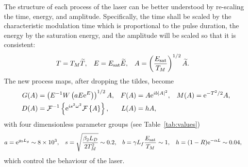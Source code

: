 %
%
%

The structure of each process of the laser can be better understood by re-scaling the time, energy, and amplitude. Specifically, the time shall be scaled by the characteristic modulation time which is proportional to the pulse duration, the energy by the saturation energy, and the amplitude will be scaled so that it is consistent:
\begin{align*}
	T &= T_M \widetilde{T},& E &= E_{\textrm{sat}} \widetilde{E},& A &= \left( \frac{E_{\textrm{sat}}}{T_M} \right)^{1/2} \widetilde{A}.
\end{align*}
The new process maps, after dropping the tildes, become
\begin{align*}
	G(A) &= \left(E^{-1} W \left( a E \textrm{e}^{E}\right) \right)^{1/2} A,&
	F(A) &= A \textrm{e}^{i b |A|^2},&
	M(A) &= \textrm{e}^{-T^2 / 2} A, \\
	D(A) &= \mathcal{F}^{-1}\left\{ \textrm{e}^{i s^2 \omega^2} \mathcal{F}\left\{ A \right\} \right\},&
	L(A) &= h A,
\end{align*}
with four dimensionless parameter groups (see Table~\ref{tab:values})
\begin{align*}
	a &= \textrm{e}^{g_0 L_g} \sim 8 \times 10^3,& s &= \sqrt{\frac{\beta_2 L_D}{2 T_M^2}} \sim 0.2,&
	b &= \gamma L_f \frac{E_{\textrm{sat}}}{T_M} \sim 1,& h &= (1 - R) \textrm{e}^{-\alpha L} \sim 0.04,
\end{align*}
which control the behaviour of the laser.

